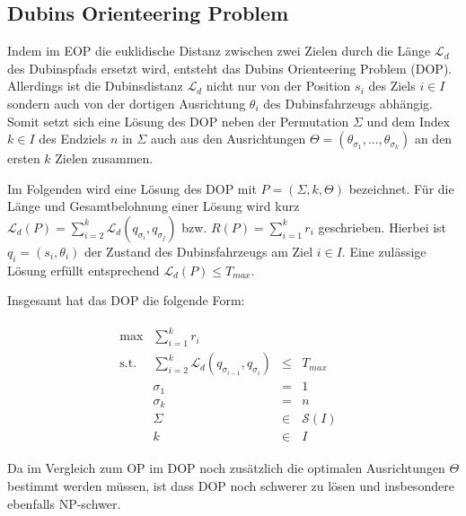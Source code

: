 \documentclass[12pt,a4paper,twoside]{article}
\theoremstyle{definition}
\numberwithin{equation}{section}
\begin{document}
\subsection{Dubins Orienteering Problem}\label{subsection:DOP}
Indem im EOP die euklidische Distanz zwischen zwei Zielen durch die Länge $\mathcal{L}_d$ des Dubinspfads ersetzt wird, entsteht das Dubins Orienteering Problem (DOP). Allerdings ist die Dubinsdistanz $\mathcal{L}_d$ nicht nur von der Position $s_i$ des Ziels $i \in I$ sondern auch von der dortigen Ausrichtung $\theta_i$ des Dubinsfahrzeugs abhängig. Somit setzt sich eine Lösung des DOP neben der Permutation $\Sigma$ und dem Index $k\in I$ des Endziels $n$ in $\Sigma$ auch aus den Ausrichtungen $\Theta = (\theta_{\sigma_1},...,\theta_{\sigma_k})$ an den ersten $k$ Zielen zusammen.

Im Folgenden wird eine Lösung des DOP mit $P = (\Sigma,k,\Theta)$ bezeichnet. Für die Länge und Gesamtbelohnung einer Lösung wird kurz $\mathcal{L}_d(P) = \sum_{i = 2}^k \mathcal{L}_{d}(q_{\sigma_i},q_{\sigma_j})$ bzw. $R(P) = \sum_{i = 1}^k r_i$ geschrieben. Hierbei ist $q_i = (s_{i},\theta_{i})$ der Zustand des Dubinsfahrzeugs am Ziel $i\in I$.
Eine zulässige Lösung erfüllt entsprechend $\mathcal{L}_d(P)\leq T_{max}$.

Insgesamt hat das DOP die folgende Form:

\begin{align}
	\begin{array}{llcll}
		\text{max}  & \sum_{i=1}^{k} r_{i}        &      &             & \\
		\text{s.t.} & \sum_{i = 2}^{k} \mathcal{L}_d(q_{\sigma_{i-1}},q_{\sigma_{i}})   & \leq    &  T_{max}         &  \\
		& \sigma_1 & = & 1 & \\
		& \sigma_k & = & n     &\\
		& \Sigma & \in & \mathcal{S}(I) & \\
		& k & \in & I & 
	\end{array}
	\tag{DOP}
	\label{DOP}
\end{align}

Da im Vergleich zum OP im DOP noch zusätzlich die optimalen Ausrichtungen $\Theta$ bestimmt werden müssen, ist dass DOP noch schwerer zu lösen und insbesondere ebenfalls NP-schwer.
\end{document}
